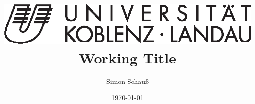 \title{
	\includegraphics[width=\textwidth, trim= 4 4 4 4]{logo.eps}
	\Huge{
		Working Title
	}
}
\date{
	\small{
		\today
	}
}
\author{Simon Schauß}

\maketitle

